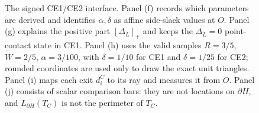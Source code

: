 \clearpage

\begin{figure}[H]
\centering
\begin{minipage}[t]{.485\textwidth}
\centering
\resizebox{\linewidth}{!}{}
\end{minipage}\hfill
\begin{minipage}[t]{.485\textwidth}
\centering
\resizebox{\linewidth}{!}{}
\end{minipage}

\medskip
\resizebox{.985\linewidth}{!}{}

\medskip
\begin{minipage}[t]{.485\textwidth}
\centering
\resizebox{\linewidth}{!}{}
\end{minipage}\hfill
\begin{minipage}[t]{.485\textwidth}
\centering
\resizebox{\linewidth}{!}{}
\end{minipage}
\caption{The signed CE1/CE2 interface.  Panel (f) records which parameters are
derived and identifies $\alpha,\delta$ as affine side-slack values at $O$.
Panel (g) explains the positive part $[\Delta_L]_+$ and keeps the
$\Delta_L=0$ point-contact state in CE1.  Panel (h) uses the valid samples
$R=3/5$, $W=2/5$, $\alpha=3/100$, with $\delta=1/10$ for CE1 and
$\delta=1/25$ for CE2; rounded coordinates are used only to draw the exact
unit triangles.  Panel (i) maps each exit $d_i^C$ to its ray and measures it
from $O$.  Panel (j) consists of scalar comparison bars: they are not
locations on $\partial H$, and $L_{\partial H}(T_C)$ is not the perimeter of
$T_C$.}
\label{fig:signed-center-notation-atlas}
\end{figure}
